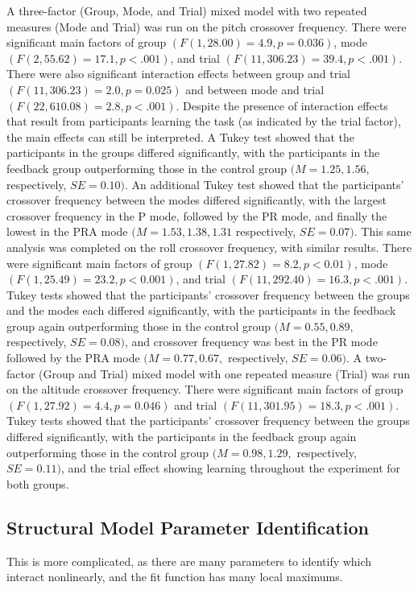 A three-factor (Group, Mode, and Trial) mixed model with two repeated measures (Mode and Trial) was run on the pitch crossover frequency.
There were significant main factors of group $(F(1, 28.00) = 4.9, p = 0.036)$, mode $(F(2, 55.62) = 17.1, p < .001)$, and trial $(F(11, 306.23) = 39.4, p < .001)$.
There were also significant interaction effects between group and trial $(F(11, 306.23) = 2.0, p = 0.025)$ and between mode and trial $(F(22, 610.08) = 2.8, p < .001)$.
Despite the presence of interaction effects that result from participants learning the task (as indicated by the trial factor), the main effects can still be interpreted.
A Tukey test showed that the participants in the groups differed significantly, with the participants in the feedback group outperforming those in the control group $(M = 1.25, 1.56,$ respectively, $SE = 0.10)$.
An additional Tukey test showed that the participants' crossover frequency between the modes differed significantly, with the largest crossover frequency in the P mode, followed by the PR mode, and finally the lowest in the PRA mode $(M = 1.53, 1.38, 1.31$ respectively, $SE = 0.07)$.
This same analysis was completed on the roll crossover frequency, with similar results.
There were significant main factors of group $(F(1, 27.82) = 8.2, p < 0.01)$, mode $(F(1, 25.49) = 23.2, p < 0.001)$, and trial $(F(11, 292.40) = 16.3, p < .001)$.
Tukey tests showed that the participants' crossover frequency between the groups and the modes each differed significantly, with the participants in the feedback group again outperforming those in the control group $(M = 0.55, 0.89,$ respectively, $SE = 0.08)$, and crossover frequency was best in the PR mode followed by the PRA mode $(M = 0.77, 0.67,$ respectively, $SE = 0.06)$.
A two-factor (Group and Trial) mixed model with one repeated measure (Trial) was run on the altitude crossover frequency.
There were significant main factors of group $(F(1, 27.92) = 4.4, p = 0.046)$ and trial $(F(11, 301.95) = 18.3, p < .001)$.
Tukey tests showed that the participants' crossover frequency between the groups differed significantly, with the participants in the feedback group again outperforming those in the control group $(M = 0.98, 1.29,$ respectively, $SE = 0.11)$, and the trial effect showing learning throughout the experiment for both groups.

\subsection{Structural Model Parameter Identification}
This is more complicated, as there are many parameters to identify which interact nonlinearly, and the fit function has many local maximums.

